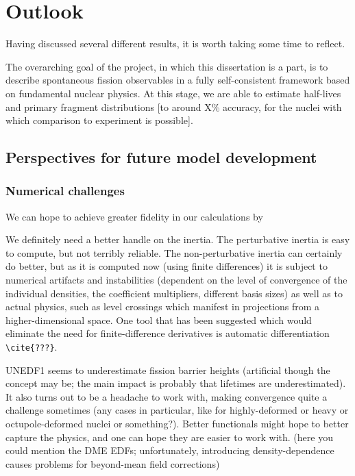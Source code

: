 \chapter{Outlook}\label{chap:Outlook}

Having discussed several different results, it is worth taking some time to reflect.

The overarching goal of the project, in which this dissertation is a part, is to describe spontaneous fission observables in a fully self-consistent framework based on fundamental nuclear physics. At this stage, we are able to estimate half-lives and primary fragment distributions [to around X\% accuracy, for the nuclei with which comparison to experiment is possible].

\section{Perspectives for future model development}

\subsection{Numerical challenges}
We can hope to achieve greater fidelity in our calculations by

We definitely need a better handle on the inertia. The perturbative inertia is easy to compute, but not terribly reliable. The non-perturbative inertia can certainly do better, but as it is computed now (using finite differences) it is subject to numerical artifacts and instabilities (dependent on the level of convergence of the individual densities, the coefficient multipliers, different basis sizes) as well as to actual physics, such as level crossings which manifest in projections from a higher-dimensional space. One tool that has been suggested which would eliminate the need for finite-difference derivatives is automatic differentiation \verb|\cite{???}|.

UNEDF1 seems to underestimate fission barrier heights (artificial though the concept may be; the main impact is probably that lifetimes are underestimated). It also turns out to be a headache to work with, making convergence quite a challenge sometimes (any cases in particular, like for highly-deformed or heavy or octupole-deformed nuclei or something?). Better functionals might hope to better capture the physics, and one can hope they are easier to work with. (here you could mention the DME EDFs; unfortunately, introducing density-dependence causes problems for beyond-mean field corrections)


